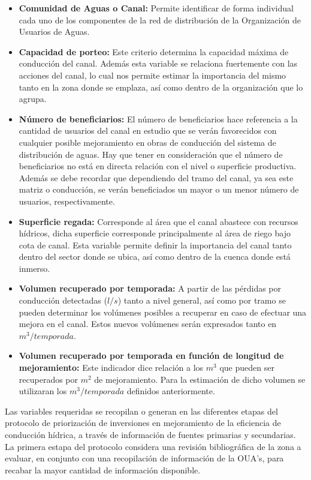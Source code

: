 \documentclass[]{article}
\begin{document}
\begin{itemize}
\item \textbf{Comunidad de Aguas o Canal:} Permite identificar de forma individual cada uno de los componentes de la red de distribución de la Organización de Usuarios de Aguas.
\item \textbf{Capacidad de porteo:} Este criterio determina la capacidad máxima de conducción del canal. Además esta variable se relaciona fuertemente con las acciones del canal, lo cual nos permite estimar la importancia del mismo tanto en la zona donde se emplaza, así como dentro de la organización que lo agrupa.
\item \textbf{Número de beneficiarios:} El número de beneficiarios hace referencia a la cantidad de usuarios del canal en estudio que se verán favorecidos con cualquier posible mejoramiento en obras de conducción del sistema de distribución de aguas. Hay que tener en consideración que el número de beneficiarios no está en directa relación con el nivel o superficie productiva. Además se debe recordar que dependiendo del tramo del canal, ya sea este matriz o conducción, se verán beneficiados un mayor o un menor número de usuarios, respectivamente.
\item \textbf{Superficie regada:} Corresponde al área que el canal abastece con recursos hídricos, dicha superficie corresponde principalmente al área de riego bajo cota de canal. Esta variable permite definir la importancia del canal tanto dentro del sector donde se ubica, así como dentro de la cuenca donde está inmerso.
\item \textbf{Volumen recuperado por temporada:} A partir de las pérdidas por conducción detectadas ($l/s$) tanto a nivel general, así como por tramo se pueden determinar los volúmenes posibles a recuperar en caso de efectuar una mejora en el canal. Estos nuevos volúmenes serán expresados tanto en $m^3/temporada$.
\item \textbf{Volumen recuperado por temporada en función de longitud de mejoramiento:} Este indicador dice relación a los $m^3$ que pueden ser recuperados por $m^2$ de mejoramiento. Para la estimación de dicho volumen se utilizaran los $m^3/temporada$ definidos anteriormente.
\end{itemize}

Las variables requeridas se recopilan o generan en las diferentes etapas del protocolo de priorización de inversiones en mejoramiento de la eficiencia de conducción hídrica, a través de información de fuentes primarias y secundarias. La primera estapa del protocolo considera una revisión bibliográfica de la zona a evaluar, en conjunto con una recopilación de información de la OUA's, para recabar la mayor cantidad de información disponible.
\end{document}
